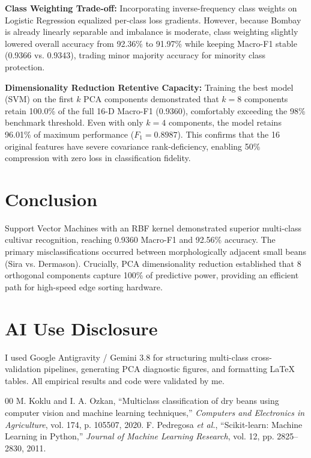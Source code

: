 \documentclass[conference,10pt]{IEEEtran}
\begin{document}
\textbf{Class Weighting Trade-off:} Incorporating inverse-frequency class weights on Logistic Regression equalized per-class loss gradients. However, because Bombay is already linearly separable and imbalance is moderate, class weighting slightly lowered overall accuracy from 92.36\% to 91.97\% while keeping Macro-F1 stable (0.9366 vs. 0.9343), trading minor majority accuracy for minority class protection.

\textbf{Dimensionality Reduction Retentive Capacity:} Training the best model (SVM) on the first $k$ PCA components demonstrated that $k=8$ components retain 100.0\% of the full 16-D Macro-F1 (0.9360), comfortably exceeding the 98\% benchmark threshold. Even with only $k=4$ components, the model retains 96.01\% of maximum performance ($F_1 = 0.8987$). This confirms that the 16 original features have severe covariance rank-deficiency, enabling 50\% compression with zero loss in classification fidelity.

\section{Conclusion}
Support Vector Machines with an RBF kernel demonstrated superior multi-class cultivar recognition, reaching 0.9360 Macro-F1 and 92.56\% accuracy. The primary misclassifications occurred between morphologically adjacent small beans (Sira vs. Dermason). Crucially, PCA dimensionality reduction established that 8 orthogonal components capture 100\% of predictive power, providing an efficient path for high-speed edge sorting hardware.

\section*{AI Use Disclosure}
I used Google Antigravity / Gemini 3.8 for structuring multi-class cross-validation pipelines, generating PCA diagnostic figures, and formatting LaTeX tables. All empirical results and code were validated by me.

\begin{thebibliography}{00}
 M. Koklu and I. A. Ozkan, ``Multiclass classification of dry beans using computer vision and machine learning techniques,'' \textit{Computers and Electronics in Agriculture}, vol. 174, p. 105507, 2020.
 F. Pedregosa \textit{et al.}, ``Scikit-learn: Machine Learning in Python,'' \textit{Journal of Machine Learning Research}, vol. 12, pp. 2825--2830, 2011.
\end{thebibliography}
\end{document}
